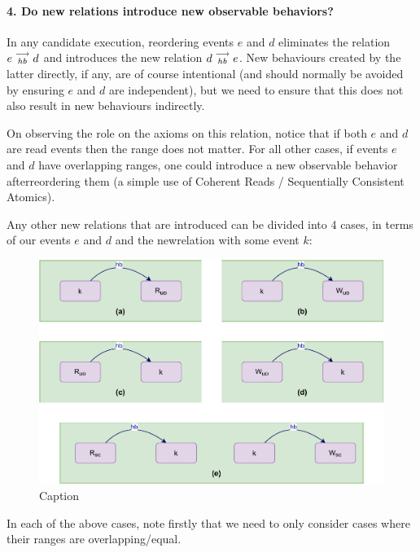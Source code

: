 
\paragraph{4. Do new relations introduce new observable behaviors?}
    In any candidate execution, reordering events $e$ and $d$ eliminates the relation $e\stackrel{\longrightarrow}{_{hb}}d$ and introduces the new relation $d\stackrel{\longrightarrow}{_{hb}}e$. 
    New behaviours created by the latter directly, if any, are 
    of course intentional (and should normally be avoided by ensuring $e$ and $d$ are independent), but we need to ensure that this does not also result in new behaviours indirectly. 
    
    On observing the role on the axioms on this relation, notice that if both $e$ and $d$ are read events then the range does not matter. For all other cases, if events $e$ and $d$ have overlapping ranges, one could introduce a new observable behavior afterreordering them (a simple use of Coherent Reads / Sequentially Consistent Atomics).     

    
    Any other new relations that are introduced can be divided into 4 cases, in terms of our events $e$ and $d$ and the newrelation with some event $k$:
    \begin{figure}[H]
        \centering
        \includegraphics[scale=0.7]{Q3(a).pdf}
        \caption{Caption}
        \label{fig:my_label}
    \end{figure}
    
    In each of the above cases, note firstly that we need to only consider cases where their ranges are overlapping/equal.
    

